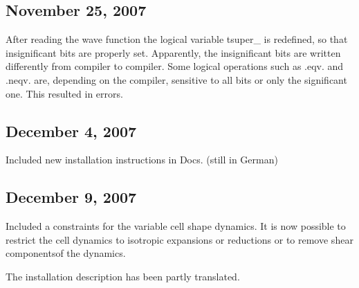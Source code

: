\documentclass[final,12pt]{article}
\begin{document}
\subsection{November 25,  2007}

After reading the wave function the logical variable tsuper\_ is
redefined, so that insignificant bits are properly set. Apparently,
the insignificant bits are written differently from compiler to
compiler. Some logical operations such as .eqv. and .neqv. are,
depending on the compiler, sensitive to all bits or only the
significant one. This resulted in errors.

\subsection{December 4,  2007}

Included new installation instructions in Docs. (still in German)

\subsection{December 9,  2007}

Included a constraints for the variable cell shape dynamics. It is now
possible to restrict the cell dynamics to isotropic expansions or
reductions or to remove shear componentsof the dynamics.

The installation description has been partly translated.


\newpage


\end{document}
